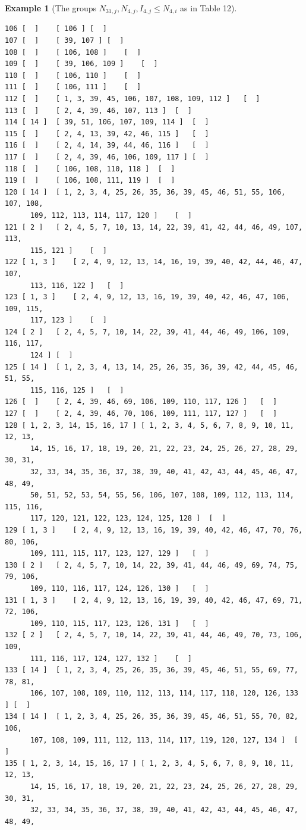 \documentclass{amsart}
\theoremstyle{plain}
\theoremstyle{definition}
\newtheorem{example}[theorem]{Example}
\theoremstyle{remark}
\begin{document}
\begin{example}[The groups $N_{31,j}, N_{4,j}, I_{4,j}\leq N_{4,i}$ as in Table 12]
\begin{verbatim}
106	[  ]	[ 106 ]	[  ]
107	[  ]	[ 39, 107 ]	[  ]
108	[  ]	[ 106, 108 ]	[  ]
109	[  ]	[ 39, 106, 109 ]	[  ]
110	[  ]	[ 106, 110 ]	[  ]
111	[  ]	[ 106, 111 ]	[  ]
112	[  ]	[ 1, 3, 39, 45, 106, 107, 108, 109, 112 ]	[  ]
113	[  ]	[ 2, 4, 39, 46, 107, 113 ]	[  ]
114	[ 14 ]	[ 39, 51, 106, 107, 109, 114 ]	[  ]
115	[  ]	[ 2, 4, 13, 39, 42, 46, 115 ]	[  ]
116	[  ]	[ 2, 4, 14, 39, 44, 46, 116 ]	[  ]
117	[  ]	[ 2, 4, 39, 46, 106, 109, 117 ]	[  ]
118	[  ]	[ 106, 108, 110, 118 ]	[  ]
119	[  ]	[ 106, 108, 111, 119 ]	[  ]
120	[ 14 ]	[ 1, 2, 3, 4, 25, 26, 35, 36, 39, 45, 46, 51, 55, 106, 107, 108, 
      109, 112, 113, 114, 117, 120 ]	[  ]
121	[ 2 ]	[ 2, 4, 5, 7, 10, 13, 14, 22, 39, 41, 42, 44, 46, 49, 107, 113, 
      115, 121 ]	[  ]
122	[ 1, 3 ]	[ 2, 4, 9, 12, 13, 14, 16, 19, 39, 40, 42, 44, 46, 47, 107, 
      113, 116, 122 ]	[  ]
123	[ 1, 3 ]	[ 2, 4, 9, 12, 13, 16, 19, 39, 40, 42, 46, 47, 106, 109, 115, 
      117, 123 ]	[  ]
124	[ 2 ]	[ 2, 4, 5, 7, 10, 14, 22, 39, 41, 44, 46, 49, 106, 109, 116, 117, 
      124 ]	[  ]
125	[ 14 ]	[ 1, 2, 3, 4, 13, 14, 25, 26, 35, 36, 39, 42, 44, 45, 46, 51, 55, 
      115, 116, 125 ]	[  ]
126	[  ]	[ 2, 4, 39, 46, 69, 106, 109, 110, 117, 126 ]	[  ]
127	[  ]	[ 2, 4, 39, 46, 70, 106, 109, 111, 117, 127 ]	[  ]
128	[ 1, 2, 3, 14, 15, 16, 17 ]	[ 1, 2, 3, 4, 5, 6, 7, 8, 9, 10, 11, 12, 13, 
      14, 15, 16, 17, 18, 19, 20, 21, 22, 23, 24, 25, 26, 27, 28, 29, 30, 31, 
      32, 33, 34, 35, 36, 37, 38, 39, 40, 41, 42, 43, 44, 45, 46, 47, 48, 49, 
      50, 51, 52, 53, 54, 55, 56, 106, 107, 108, 109, 112, 113, 114, 115, 116, 
      117, 120, 121, 122, 123, 124, 125, 128 ]	[  ]
129	[ 1, 3 ]	[ 2, 4, 9, 12, 13, 16, 19, 39, 40, 42, 46, 47, 70, 76, 80, 106, 
      109, 111, 115, 117, 123, 127, 129 ]	[  ]
130	[ 2 ]	[ 2, 4, 5, 7, 10, 14, 22, 39, 41, 44, 46, 49, 69, 74, 75, 79, 106, 
      109, 110, 116, 117, 124, 126, 130 ]	[  ]
131	[ 1, 3 ]	[ 2, 4, 9, 12, 13, 16, 19, 39, 40, 42, 46, 47, 69, 71, 72, 106, 
      109, 110, 115, 117, 123, 126, 131 ]	[  ]
132	[ 2 ]	[ 2, 4, 5, 7, 10, 14, 22, 39, 41, 44, 46, 49, 70, 73, 106, 109, 
      111, 116, 117, 124, 127, 132 ]	[  ]
133	[ 14 ]	[ 1, 2, 3, 4, 25, 26, 35, 36, 39, 45, 46, 51, 55, 69, 77, 78, 81, 
      106, 107, 108, 109, 110, 112, 113, 114, 117, 118, 120, 126, 133 ]	[  ]
134	[ 14 ]	[ 1, 2, 3, 4, 25, 26, 35, 36, 39, 45, 46, 51, 55, 70, 82, 106, 
      107, 108, 109, 111, 112, 113, 114, 117, 119, 120, 127, 134 ]	[  ]
135	[ 1, 2, 3, 14, 15, 16, 17 ]	[ 1, 2, 3, 4, 5, 6, 7, 8, 9, 10, 11, 12, 13, 
      14, 15, 16, 17, 18, 19, 20, 21, 22, 23, 24, 25, 26, 27, 28, 29, 30, 31, 
      32, 33, 34, 35, 36, 37, 38, 39, 40, 41, 42, 43, 44, 45, 46, 47, 48, 49, 

\end{verbatim}
\end{example}
\end{document}
